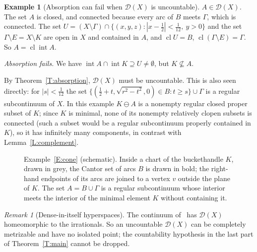 \documentclass[11pt,reqno]{amsart}
\theoremstyle{plain}
\theoremstyle{definition}
\newtheorem{example}[theorem]{Example}
\theoremstyle{remark}
\newtheorem{remark}[theorem]{Remark}
\newcommand{\D}{\mathcal{D}}
\newcommand{\cl}{\operatorname{cl}}
\newcommand{\intr}{\operatorname{int}}
\newcommand{\rd}{\ominus}
\begin{document}
\begin{example}[Absorption can fail when $\D(X)$ is uncountable]
\emph{$A\in\D(X)$.} The set $A$ is closed, and connected because every arc of $B$ meets $\Gamma$, which is connected. The set $U=(X\setminus\Gamma)\cap\{(x,y,z):|x-\tfrac12|<\tfrac1{12},\ y>0\}$ and the set $\Gamma\setminus E=X\setminus K$ are open in $X$ and contained in $A$, and $\cl U=B$, $\cl(\Gamma\setminus E)=\Gamma$. So $A=\cl\intr A$.

\emph{Absorption fails.} We have $\intr A\cap\intr K\supseteq U\neq\emptyset$, but $K\not\subseteq A$.

By Theorem~\ref{T:absorption}, $\D(X)$ must be uncountable. This is also seen directly: for $|s|<\tfrac1{12}$ the set $\{(\tfrac12+t,\sqrt{r^2-t^2},0)\in B:t\ge s\}\cup\Gamma$ is a regular subcontinuum of $X$. In this example $K\rd A$ is a nonempty regular closed proper subset of $K$; since $K$ is minimal, none of its nonempty relatively clopen subsets is connected (such a subset would be a regular subcontinuum properly contained in $K$), so it has infinitely many components, in contrast with Lemma~\ref{L:complement}.
\end{example}

\begin{figure}[ht]
\centering
{}
\caption{Example~\ref{E:cone} (schematic). Inside a chart of the buckethandle $K$, drawn in grey, the Cantor set of arcs $B$ is drawn in bold; the right-hand endpoints of its arcs are joined to a vertex $v$ outside the plane of $K$. The set $A=B\cup\Gamma$ is a regular subcontinuum whose interior meets the interior of the minimal element $K$ without containing it.}\label{F:cone}
\end{figure}

\begin{remark}[Dense-in-itself hyperspaces]
The continuum of~\cite{AdAirr} has $\D(X)$ homeomorphic to the irrationals. So an uncountable $\D(X)$ can be completely metrizable and have no isolated point; the countability hypothesis in the last part of Theorem~\ref{T:main} cannot be dropped.
\end{remark}
\end{document}

